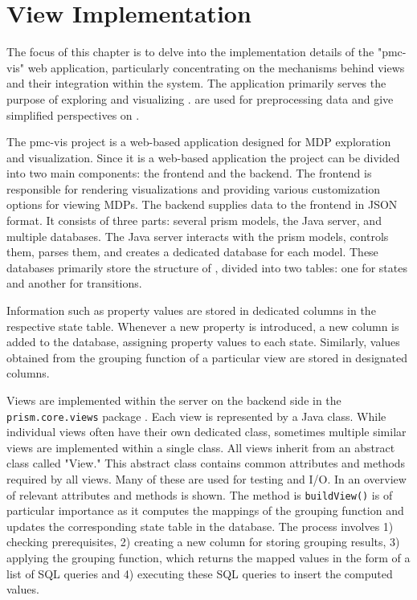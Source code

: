 \documentclass[preview]{standalone}
\begin{document}
\section{View Implementation} \label{ch:viewimpl}

The focus of this chapter is to delve into the implementation details of the "pmc-vis" web application, particularly concentrating on the mechanisms behind views and their integration within the system. The application primarily serves the purpose of exploring and visualizing \mdpsN. \viewsNC are used for preprocessing data and give simplified perspectives on \mdpsN.


The pmc-vis project is a web-based application designed for MDP exploration and visualization. Since it is a web-based application the project can be divided into two main components: the frontend and the backend. The frontend is responsible for rendering visualizations and providing various customization options for viewing MDPs. The backend supplies data to the frontend in JSON format. It consists of three parts: several prism models, the Java server, and multiple databases. The Java server interacts with the prism models, controls them, parses them, and creates a dedicated database for each model. These databases primarily store the structure of \mdpsN, divided into two tables: one for states and another for transitions.

Information such as property values are stored in dedicated columns in the respective state table. Whenever a new property is introduced, a new column is added to the database, assigning property values to each state. Similarly, values obtained from the grouping function of a particular view are stored in designated columns.

Views are implemented within the server on the backend side in the 
\texttt{prism.core.views} package . 
Each view is represented by a Java class. While individual views often have their own dedicated class, sometimes multiple similar views are implemented within a single class. All views inherit from an abstract class called "View." This abstract class contains common attributes and methods required by all views. Many of these are used for testing and I/O. In  an overview of relevant attributes and methods is shown. The method is \texttt{buildView()} is of particular importance as it computes the mappings of the grouping function and updates the corresponding state table in the database. The process involves 1) checking prerequisites, 2) creating a new column for storing grouping results, 3) applying the grouping function, which returns the mapped values in the form of a list of SQL queries and 4) executing these SQL queries to insert the computed values.
\end{document}
